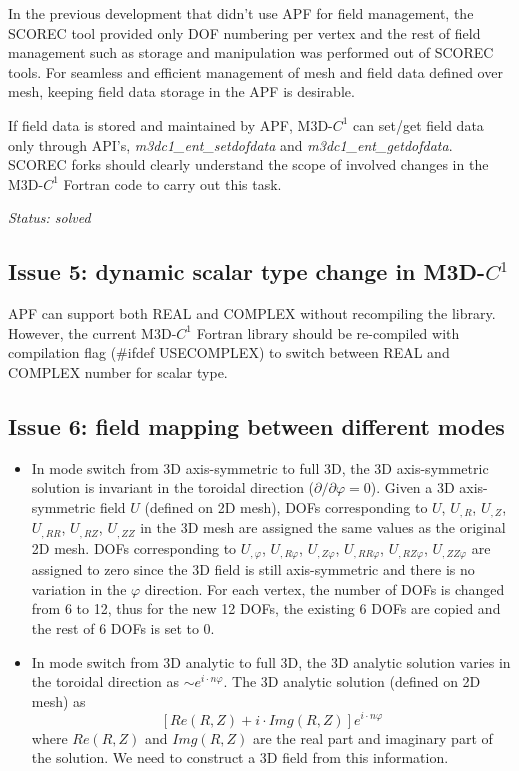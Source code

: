 \documentclass[11pt]{article}  %
\begin{document}
In the previous development that didn't use APF for field management, the SCOREC tool provided only DOF numbering per vertex and the rest of field management such as storage and manipulation was performed out of SCOREC tools. For seamless and efficient management of mesh and field data defined over mesh, keeping field data storage in the APF is desirable. 

If field data is stored and maintained by APF, M3D-$C^1$ can set/get field data only through API's, \emph{m3dc1\_ent\_setdofdata} and \emph{m3dc1\_ent\_getdofdata}. SCOREC forks should clearly understand the scope of involved changes in the M3D-$C^1$ Fortran code to carry out this task.

\textit{Status: solved}
\subsection{Issue 5: dynamic scalar type change in M3D-$C^1$}

APF can support both REAL and COMPLEX without recompiling the library. However, the current M3D-$C^1$ Fortran library should be re-compiled with compilation flag (\#ifdef USECOMPLEX) to switch between REAL and COMPLEX number for scalar type. 

\subsection{Issue 6: field mapping between different modes }
\begin{itemize}
\item In mode switch from 3D axis-symmetric to full 3D, the 3D axis-symmetric solution is invariant in the toroidal direction ($\partial/\partial \varphi =0$).
Given a 3D axis-symmetric field $U$ (defined on 2D mesh),  DOFs corresponding to $U$, $U_{,R}$, $U_{,Z}$, $U_{,RR}$, $U_{,RZ}$, $U_{,ZZ}$ in the 3D mesh are assigned the same values as the original 2D mesh. DOFs corresponding to $ U_{,\varphi}$, $U_{,R\varphi}$, $U_{,Z\varphi}$, $U_{,RR\varphi}$, $U_{,RZ\varphi}$, $U_{,ZZ\varphi}$ are assigned to zero since the 3D field is still axis-symmetric and there is no variation in the $\varphi$ direction. For each vertex, the number of DOFs is changed from 6 to 12, thus for the new 12 DOFs, the existing 6 DOFs are copied and the rest of 6 DOFs is set to 0.

\item In mode switch from 3D analytic to full 3D, the 3D analytic solution varies in the toroidal direction as $\sim e^{i\cdot n\varphi}$. The 3D analytic solution (defined on 2D mesh) as
\begin{equation}
\left[  Re(R,Z)+i\cdot Img(R,Z)  \right] e^{i\cdot n\varphi}
 \end{equation} 
  where $Re(R,Z)$ and $Img(R,Z)$ are the real part and imaginary  part of the solution. We need to construct a 3D field from this information.
\end{itemize}
\end{document}
